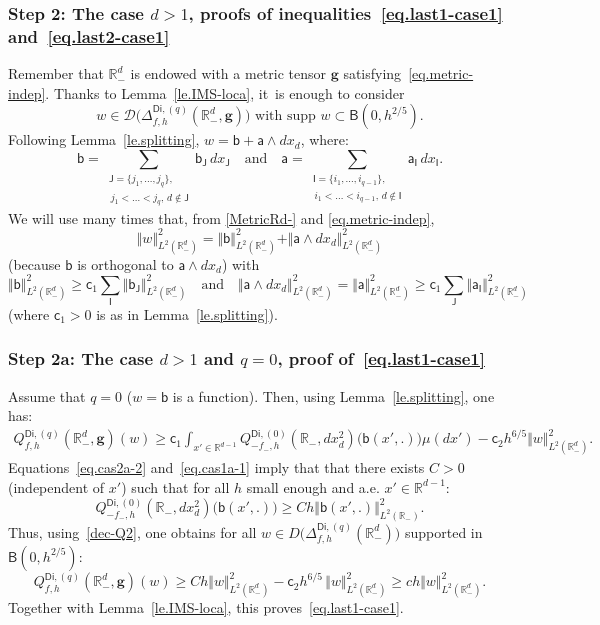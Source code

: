 \documentclass[JEP,XML,SOM,Unicode,NoEqCountersInSection,NoFloatCountersInSection,published]{cedram}
\newcommand{\quand}{\quad\text{and}\quad}
\newcommand{\mbf}[1]{\mathbf{#1}}
\theoremstyle{plain}
\theoremstyle{definition}
\begin{document}
\subsubsection*{Step 2: The case $d>1$, proofs of
inequalities~\eqref{eq.last1-case1} and~\eqref{eq.last2-case1}}
Remember that $\mathbb R^d_-$ is endowed with a metric tensor $ \mbf
g$ satisfying~\eqref{eq.metric-indep}. Thanks to
Lemma~\ref{le.IMS-loca}, it~is enough to consider
\[
w\in \mathcal D \bigl(\Delta^{\mathsf{Di},(q)}_{f,h}(\mathbb R_-^d,
\mbf g)\bigr) \text{ with supp } w\subset \mathsf B(0,h^{2/5}).
\]
Following Lemma~\ref{le.splitting}, $w=\mathsf b + \mathsf a \wedge dx_d$, where:\[
\mathsf b =\sum_{\substack{\mathsf J=\{j_1,\ldots,j_q\},\\ \, j_1<\ldots<j_q, \, d\notin \mathsf J} } \mathsf b_{\mathsf J}\, dx_{\mathsf J} \quand \mathsf a =\sum_{\substack{\mathsf I=\{i_1,\ldots,i_{q-1}\},\\ \, i_1<\ldots<i_{q-1}, \, d\notin \mathsf I }} \mathsf a_{\mathsf I}\, dx_{\mathsf I}.
\]
We will use many times that, from \ref{MetricRd-} and \eqref{eq.metric-indep},
\[
\Vert w \Vert_{L^2(\mathbb R^d_-)}^2= \Vert \mathsf b
\Vert_{L^2(\mathbb R^d_-)}^2+ \Vert \mathsf a \wedge dx_d
\Vert_{L^2(\mathbb R^d_-)}^2
\]
(because $\mathsf b $ is orthogonal
to $\mathsf a \wedge dx_d$) with
\[
\Vert \mathsf b
\Vert_{L^2(\mathbb R^d_-)}^2\ge \mathsf c_1 \sum_{\mathsf I}
\Vert \mathsf b_{\mathsf J} \Vert_{L^2(\mathbb R^d_-)}^2\quand \Vert \mathsf a \wedge dx_d \Vert_{L^2(\mathbb R^d_-)}^2 \! =\! \Vert \mathsf a \Vert_{L^2(\mathbb R^d_-)}^2 \!\ge \! \mathsf c_1 \sum_{\mathsf J} \Vert \mathsf a_{\mathsf I} \Vert_{L^2(\mathbb R^d_-)}^2
\]
(where $\mathsf c_1 >0$ is as in Lemma~\ref{le.splitting}).

\subsubsection*{Step 2a: The case $d>1$ and $q= 0$, proof of~\eqref{eq.last1-case1}}
Assume that $q= 0$ (\ie $w=\mathsf b$ is a function). Then, using Lemma~\ref{le.splitting}, one has:
\begin{align}\label{dec-Q2}
Q^{\mathsf{Di},(q)}_{f,h}(\mathbb R^{d}_-, \mbf g)(w)\!\ge\! \mathsf
c_1\!\! \int_{x'\in \mathbb R^{d-1} } \!\!\! \!\!\! \!\!\! \! Q^{\mathsf{Di},(0)}_{-f_-,h}(\mathbb R_-,dx_d^2)\bigl(\mathsf b(x',.)\bigr) \mu(dx')-\mathsf c_2h^{6/5} \Vert w \Vert_{L^2(\mathbb R^d_-)}^2.
\end{align}
Equations~\eqref{eq.cas2a-2} and~\eqref{eq.cas1a-1} imply that that there exists $C>0$ (independent of $x'$) such that for all $h$ small enough and a.e. $x'\in \mathbb R^{d-1}$:
\[
Q^{\mathsf{Di},(0)}_{-f_-,h}(\mathbb R_-,dx_d^2)\bigl(\mathsf b (x',.)\bigr) \ge Ch \Vert \mathsf b (x',.) \Vert_{L^2(\mathbb R_-)}^2.
\]
Thus, using~\eqref{dec-Q2}, one obtains for all $w\in D\bigl(\Delta_{f,h}^{\mathsf{Di},(q)}(\mathbb R_-^d) \bigr)$ supported in $\mathsf B(0,h^{2/5 })$:
\[
Q^{\mathsf{Di},(q)}_{f,h}(\mathbb R_-^d, \mbf g)(w)\ge Ch \Vert w \Vert_{L^2(\mathbb R^d_-)}^2-\mathsf c_2h^{6/5}\, \Vert w \Vert_{L^2(\mathbb R^d_-)}^2\ge ch \Vert w \Vert_{L^2(\mathbb R^d_-)}^2.
\]
Together with Lemma~\ref{le.IMS-loca}, this proves~\eqref{eq.last1-case1}.
\end{document}
